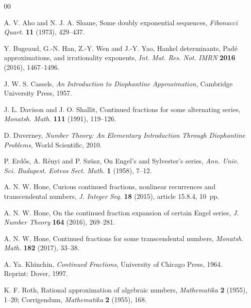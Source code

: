 \documentclass[10pt, a4paper]{amsart}
\numberwithin{equation}{section}
\theoremstyle{plain}
\theoremstyle{definition}
\begin{document}
\begin{thebibliography}{00}

A. V. Aho and N. J. A. Sloane, 
Some doubly exponential sequences, 
\textit{Fibonacci Quart.} \textbf{11} (1973), 429--437.

Y. Bugeaud, G.-N. Han, Z.-Y. Wen and J.-Y. Yao, 
Hankel determinants, Pad\'{e} approximations, 
and irrationality exponents, 
\textit{Int. Mat. Res. Not. IMRN} \textbf{2016} (2016),
1467--1496. 
 
J. W. S. Cassels, 
\textit{An Introduction to Diophantine Approximation}, 
Cambridge University Press, 1957.

J. L. Davison and J. O. Shallit, 
Continued fractions for some alternating series, 
\textit{Monatsh. Math.} \textbf{111} (1991), 119--126.

D. Duverney, 
\textit{Number Theory: 
An Elementary Introduction Through Diophantine Problems}, 
World Scientific, 2010.

P. Erd\H{o}s, A. R\'{e}nyi and P. Sz\"{u}sz,
On Engel's and Sylvester's series, 
\textit{Ann. Univ. Sci.
Budapest. Eotvos Sect. Math.} \textbf{1} (1958), 7--12.

A. N. W. Hone, 
Curious continued fractions, nonlinear recurrences and transcendental numbers, 
\textit{J. Integer Seq.} \textbf{18} (2015), %
article 15.8.4, 10~pp.

A. N. W. Hone, 
On the continued fraction expansion of certain Engel series, 
\textit{J. Number Theory} \textbf{164} (2016), 269--281.

A. N. W. Hone, 
Continued fractions for some transcendental numbers,
\textit{Monatsh. Math.} \textbf{182} (2017), %
33--38.


A. Ya. Khinchin, 
\textit{Continued Fractions}, 
University of Chicago Press, 1964.
Reprint: Dover, 1997.


K. F. Roth, 
Rational approximation of algebraic numbers, 
\textit{Mathematika} \textbf{2} (1955), 1--20; 
Corrigendum, \textit{Mathematika} \textbf{2} (1955), 168.


\end{thebibliography}
\end{document}
